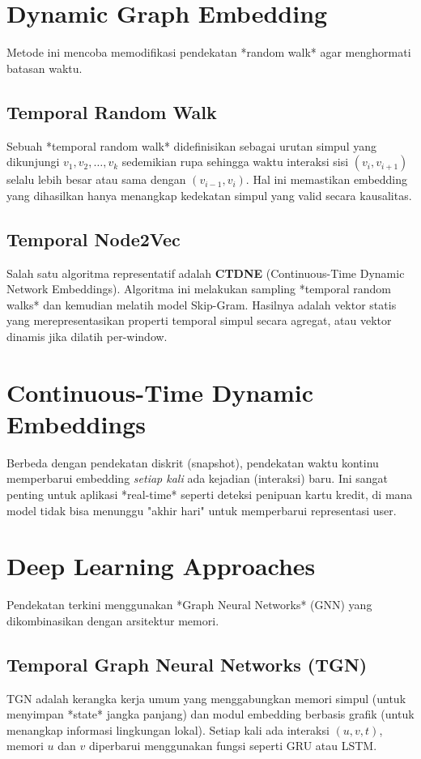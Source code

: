 \documentclass[12pt,a4paper]{book}
\begin{document}
\section{Dynamic Graph Embedding}
Metode ini mencoba memodifikasi pendekatan *random walk* agar menghormati batasan waktu.

\subsection{Temporal Random Walk}
Sebuah *temporal random walk* didefinisikan sebagai urutan simpul yang dikunjungi $v_1, v_2, \dots, v_k$ sedemikian rupa sehingga waktu interaksi sisi $(v_i, v_{i+1})$ selalu lebih besar atau sama dengan $(v_{i-1}, v_i)$. Hal ini memastikan embedding yang dihasilkan hanya menangkap kedekatan simpul yang valid secara kausalitas.

\subsection{Temporal Node2Vec}
Salah satu algoritma representatif adalah \textbf{CTDNE} (Continuous-Time Dynamic Network Embeddings). Algoritma ini melakukan sampling *temporal random walks* dan kemudian melatih model Skip-Gram. Hasilnya adalah vektor statis yang merepresentasikan properti temporal simpul secara agregat, atau vektor dinamis jika dilatih per-window.

\section{Continuous-Time Dynamic Embeddings}
Berbeda dengan pendekatan diskrit (snapshot), pendekatan waktu kontinu memperbarui embedding \textit{setiap kali} ada kejadian (interaksi) baru. Ini sangat penting untuk aplikasi *real-time* seperti deteksi penipuan kartu kredit, di mana model tidak bisa menunggu "akhir hari" untuk memperbarui representasi user.

\section{Deep Learning Approaches}
Pendekatan terkini menggunakan *Graph Neural Networks* (GNN) yang dikombinasikan dengan arsitektur memori.

\subsection{Temporal Graph Neural Networks (TGN)}
TGN adalah kerangka kerja umum yang menggabungkan memori simpul (untuk menyimpan *state* jangka panjang) dan modul embedding berbasis grafik (untuk menangkap informasi lingkungan lokal). Setiap kali ada interaksi $(u, v, t)$, memori $u$ dan $v$ diperbarui menggunakan fungsi seperti GRU atau LSTM.
\end{document}
